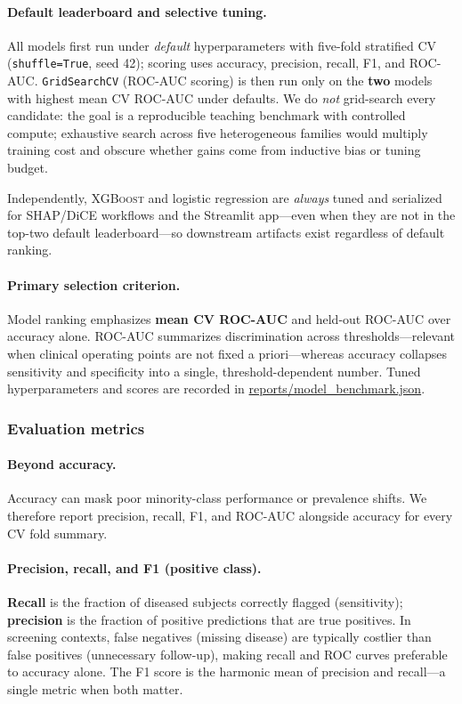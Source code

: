 \documentclass[11pt,a4paper]{article}
\begin{document}
\paragraph{Default leaderboard and selective tuning.}
All models first run under \emph{default} hyperparameters with five-fold stratified CV (\texttt{shuffle=True}, seed \num{42}); scoring uses accuracy, precision, recall, F1, and ROC-AUC. \texttt{GridSearchCV} (ROC-AUC scoring) is then run only on the \textbf{two} models with highest mean CV ROC-AUC under defaults. We do \emph{not} grid-search every candidate: the goal is a reproducible teaching benchmark with controlled compute; exhaustive search across five heterogeneous families would multiply training cost and obscure whether gains come from inductive bias or tuning budget.

Independently, \textsc{XGBoost} and logistic regression are \emph{always} tuned and serialized for SHAP/DiCE workflows and the Streamlit app—even when they are not in the top-two default leaderboard—so downstream artifacts exist regardless of default ranking.

\paragraph{Primary selection criterion.}
Model ranking emphasizes \textbf{mean CV ROC-AUC} and held-out ROC-AUC over accuracy alone. ROC-AUC summarizes discrimination across thresholds—relevant when clinical operating points are not fixed a priori—whereas accuracy collapses sensitivity and specificity into a single, threshold-dependent number. Tuned hyperparameters and scores are recorded in \url{reports/model_benchmark.json}.

\subsubsection{Evaluation metrics}
\label{sec:eval_metrics}

\paragraph{Beyond accuracy.}
Accuracy can mask poor minority-class performance or prevalence shifts. We therefore report precision, recall, F1, and ROC-AUC alongside accuracy for every CV fold summary.

\paragraph{Precision, recall, and F1 (positive class).}
\textbf{Recall} is the fraction of diseased subjects correctly flagged (sensitivity); \textbf{precision} is the fraction of positive predictions that are true positives. In screening contexts, false negatives (missing disease) are typically costlier than false positives (unnecessary follow-up), making recall and ROC curves preferable to accuracy alone. The F1 score is the harmonic mean of precision and recall—a single metric when both matter.
\end{document}
